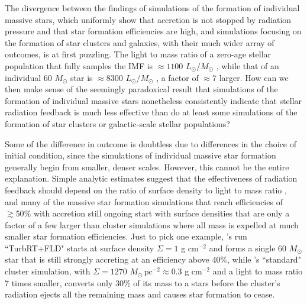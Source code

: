 \documentclass[useAMS,usenatbib]{mn2e}
\begin{document}
The divergence between the findings of simulations of the formation of individual massive stars, which uniformly show that accretion is not stopped by radiation pressure and that star formation efficiencies are high, and simulations focusing on the formation of star clusters and galaxies, with their much wider array of outcomes, is at first puzzling. The light to mass ratio of a zero-age stellar population that fully samples the IMF is $\approx 1100$ $L_\odot / M_\odot$ \citep[e.g.,][chapter 7]{krumholz17b}, while that of an individual 60 $M_\odot$ star is $\approx 8300$ $L_\odot / M_\odot$ \citep[e.g.,][]{ekstrom12a}, a factor of $\approx 7$ larger. How can we then make sense of the seemingly paradoxical result that simulations of the formation of individual massive stars nonetheless consistently indicate that stellar radiation feedback is much less effective than do at least some simulations of the formation of star clusters or galactic-scale stellar populations?

Some of the difference in outcome is doubtless due to differences in the choice of initial condition, since the simulations of individual massive star formation generally begin from smaller, denser scales. However, this cannot be the entire explanation. Simple analytic estimates suggest that the effectiveness of radiation feedback should depend on the ratio of surface density to light to mass ratio \citep[e.g.,][]{fall10a}, and many of the massive star formation simulations that reach efficiencies of $\gtrsim 50\%$ with accretion still ongoing start with surface densities that are only a factor of a few larger than cluster simulations where all mass is expelled at much smaller star formation efficiencies. Just to pick one example, \citet{rosen16a}'s run ``TurbRT+FLD" starts at surface density $\Sigma = 1$ g cm$^{-2}$ and forms a single 60 $M_\odot$ star that is still strongly accreting at an efficiency above $40\%$, while \citet{grudic18a}'s ``standard" cluster simulation, with $\Sigma = 1270$ $M_\odot\,\mbox{pc}^{-2}\approx 0.3$ g cm$^{-2}$ and a light to mass ratio 7 times smaller, converts only $30\%$ of its mass to a stars before the cluster's radiation ejects all the remaining mass and causes star formation to cease.
\end{document}
